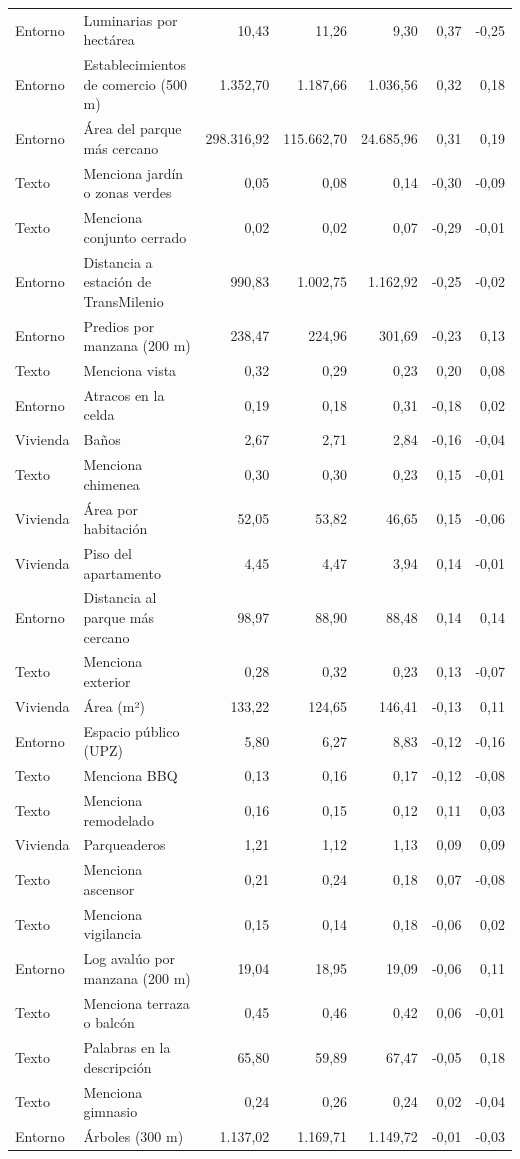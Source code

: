 \begin{table}[!h]
{\begin{tabular}[t]{llrrrrr}
Entorno & Luminarias por hectárea & 10,43 & 11,26 & 9,30 & 0,37 & -0,25\\
Entorno & Establecimientos de comercio (500 m) & 1.352,70 & 1.187,66 & 1.036,56 & 0,32 & 0,18\\
Entorno & Área del parque más cercano & 298.316,92 & 115.662,70 & 24.685,96 & 0,31 & 0,19\\
Texto & Menciona jardín o zonas verdes & 0,05 & 0,08 & 0,14 & -0,30 & -0,09\\
Texto & Menciona conjunto cerrado & 0,02 & 0,02 & 0,07 & -0,29 & -0,01\\
Entorno & Distancia a estación de TransMilenio & 990,83 & 1.002,75 & 1.162,92 & -0,25 & -0,02\\
Entorno & Predios por manzana (200 m) & 238,47 & 224,96 & 301,69 & -0,23 & 0,13\\
Texto & Menciona vista & 0,32 & 0,29 & 0,23 & 0,20 & 0,08\\
Entorno & Atracos en la celda & 0,19 & 0,18 & 0,31 & -0,18 & 0,02\\
Vivienda & Baños & 2,67 & 2,71 & 2,84 & -0,16 & -0,04\\
Texto & Menciona chimenea & 0,30 & 0,30 & 0,23 & 0,15 & -0,01\\
Vivienda & Área por habitación & 52,05 & 53,82 & 46,65 & 0,15 & -0,06\\
Vivienda & Piso del apartamento & 4,45 & 4,47 & 3,94 & 0,14 & -0,01\\
Entorno & Distancia al parque más cercano & 98,97 & 88,90 & 88,48 & 0,14 & 0,14\\
Texto & Menciona exterior & 0,28 & 0,32 & 0,23 & 0,13 & -0,07\\
Vivienda & Área (m²) & 133,22 & 124,65 & 146,41 & -0,13 & 0,11\\
Entorno & Espacio público (UPZ) & 5,80 & 6,27 & 8,83 & -0,12 & -0,16\\
Texto & Menciona BBQ & 0,13 & 0,16 & 0,17 & -0,12 & -0,08\\
Texto & Menciona remodelado & 0,16 & 0,15 & 0,12 & 0,11 & 0,03\\
Vivienda & Parqueaderos & 1,21 & 1,12 & 1,13 & 0,09 & 0,09\\
Texto & Menciona ascensor & 0,21 & 0,24 & 0,18 & 0,07 & -0,08\\
Texto & Menciona vigilancia & 0,15 & 0,14 & 0,18 & -0,06 & 0,02\\
Entorno & Log avalúo por manzana (200 m) & 19,04 & 18,95 & 19,09 & -0,06 & 0,11\\
Texto & Menciona terraza o balcón & 0,45 & 0,46 & 0,42 & 0,06 & -0,01\\
Texto & Palabras en la descripción & 65,80 & 59,89 & 67,47 & -0,05 & 0,18\\
Texto & Menciona gimnasio & 0,24 & 0,26 & 0,24 & 0,02 & -0,04\\
Entorno & Árboles (300 m) & 1.137,02 & 1.169,71 & 1.149,72 & -0,01 & -0,03\\
\bottomrule
\end{tabular}}
\end{table}
